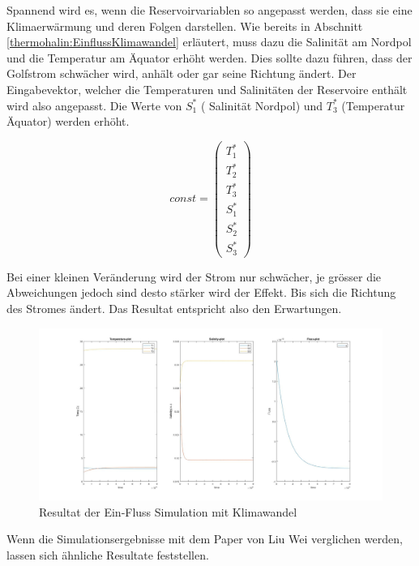 Spannend wird es, wenn die Reservoirvariablen so angepasst werden, dass sie eine Klimaerwärmung und deren Folgen darstellen. Wie bereits in Abschnitt \ref{thermohalin:EinflussKlimawandel} erläutert, muss dazu die Salinität am Nordpol und die Temperatur am Äquator erhöht werden. Dies sollte dazu führen, dass der Golfstrom schwächer wird, anhält oder gar seine Richtung ändert. 
Der Eingabevektor, welcher die Temperaturen und Salinitäten der Reservoire enthält wird also angepasst.
Die Werte von $S_1^*$ ( Salinität Nordpol) und $T_3^*$ (Temperatur Äquator) werden erhöht.

\begin{equation*}
const = \begin{pmatrix}T_{1}^{*} \\ T_{2}^{*} \\ T_{3}^{*} \\ S_{1}^{*} \\ S_{2}^{*} \\ S_{3}^{*}\end{pmatrix}
\end{equation*}



Bei einer kleinen Veränderung wird der Strom nur schwächer, je grösser die Abweichungen jedoch sind desto stärker wird der Effekt.
Bis sich die Richtung des Stromes ändert.
Das Resultat entspricht also den Erwartungen. 

\begin{figure}
	\centering
	\includegraphics[width=14cm]{thermohalin/Code/graphs/3b1f-skript-klimawandel.jpg}
	\caption{Resultat der Ein-Fluss Simulation mit Klimawandel}
	\label{thermohalin:3b1f-skript-klimawandel}
\end{figure}

Wenn die Simulationsergebnisse mit dem Paper von Liu Wei \cite{thermohalin:liuwei} verglichen werden, lassen sich ähnliche Resultate feststellen.


